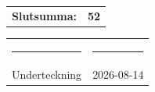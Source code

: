 \documentclass[a4paper,11pt]{article}
\begin{document}
\vspace{0.8cm}


\begin{flushright}

\begin{tabular}{lr}
    \textbf{Slutsumma:} & \textbf{52}
\end{tabular}

\end{flushright}

\vfill


\begin{center}

\begin{tabular}{p{6cm} p{6cm}}
    \rule{6cm}{0.4pt} &
    \rule{6cm}{0.4pt} \\[0.15cm]
    Underteckning &
    2026-08-14
\end{tabular}

\end{center}
\end{document}
